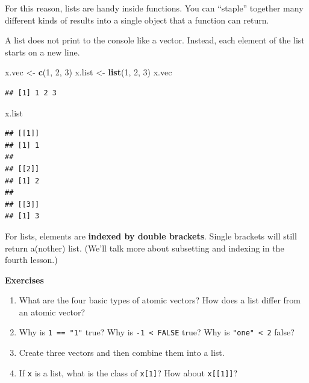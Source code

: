 \documentclass[
]{book}
\newenvironment{Shaded}{\begin{snugshade}}{\end{snugshade}}
\newcommand{\DecValTok}[1]{\textcolor[rgb]{0.00,0.00,0.81}{#1}}
\newcommand{\FunctionTok}[1]{\textcolor[rgb]{0.13,0.29,0.53}{\textbf{#1}}}
\newcommand{\NormalTok}[1]{#1}
\newcommand{\OtherTok}[1]{\textcolor[rgb]{0.56,0.35,0.01}{#1}}
\begin{document}
For this reason, lists are handy inside functions. You can ``staple'' together many different kinds of results into a single object that a function can return.

A list does not print to the console like a vector. Instead, each element of the list starts on a new line.

\begin{Shaded}
\begin{Highlighting}[]
\NormalTok{x.vec }\OtherTok{\textless{}{-}} \FunctionTok{c}\NormalTok{(}\DecValTok{1}\NormalTok{, }\DecValTok{2}\NormalTok{, }\DecValTok{3}\NormalTok{)}
\NormalTok{x.list }\OtherTok{\textless{}{-}} \FunctionTok{list}\NormalTok{(}\DecValTok{1}\NormalTok{, }\DecValTok{2}\NormalTok{, }\DecValTok{3}\NormalTok{)}
\NormalTok{x.vec}
\end{Highlighting}
\end{Shaded}

\begin{verbatim}
## [1] 1 2 3
\end{verbatim}

\begin{Shaded}
\begin{Highlighting}[]
\NormalTok{x.list}
\end{Highlighting}
\end{Shaded}

\begin{verbatim}
## [[1]]
## [1] 1
## 
## [[2]]
## [1] 2
## 
## [[3]]
## [1] 3
\end{verbatim}

For lists, elements are \textbf{indexed by double brackets}. Single brackets will still return a(nother) list. (We'll talk more about subsetting and indexing in the fourth lesson.)

\textbf{Exercises}

\begin{enumerate}
\def\labelenumi{\arabic{enumi}.}
\item
  What are the four basic types of atomic vectors? How does a list differ from an atomic vector?
\item
  Why is \texttt{1\ ==\ "1"} true? Why is \texttt{-1\ \textless{}\ FALSE} true? Why is \texttt{"one"\ \textless{}\ 2} false?
\item
  Create three vectors and then combine them into a list.
\item
  If \texttt{x} is a list, what is the class of \texttt{x{[}1{]}}? How about \texttt{x{[}{[}1{]}{]}}?
\end{enumerate}
\end{document}
